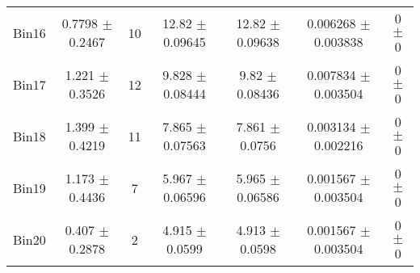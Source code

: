 \begin{tabular}{@{\extracolsep{4pt}}lcccccc@{}}
     Bin16 & 0.7798 $\pm$ 0.2467 & 10 & 12.82 $\pm$ 0.09645 & 12.82 $\pm$ 0.09638 & 0.006268 $\pm$ 0.003838 & 0 $\pm$ 0 \\ 
     Bin17 & 1.221 $\pm$ 0.3526 & 12 & 9.828 $\pm$ 0.08444 & 9.82 $\pm$ 0.08436 & 0.007834 $\pm$ 0.003504 & 0 $\pm$ 0 \\ 
     Bin18 & 1.399 $\pm$ 0.4219 & 11 & 7.865 $\pm$ 0.07563 & 7.861 $\pm$ 0.0756 & 0.003134 $\pm$ 0.002216 & 0 $\pm$ 0 \\ 
     Bin19 & 1.173 $\pm$ 0.4436 & 7 & 5.967 $\pm$ 0.06596 & 5.965 $\pm$ 0.06586 & 0.001567 $\pm$ 0.003504 & 0 $\pm$ 0 \\ 
     Bin20 & 0.407 $\pm$ 0.2878 & 2 & 4.915 $\pm$ 0.0599 & 4.913 $\pm$ 0.0598 & 0.001567 $\pm$ 0.003504 & 0 $\pm$ 0 \\ 
\hline\hline
  \end{tabular}
